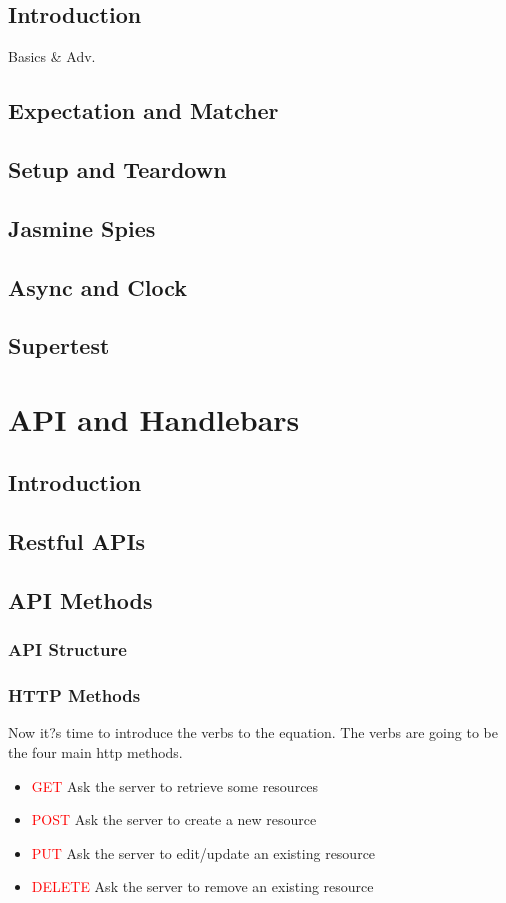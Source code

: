 \documentclass[a4paper]{article}
\begin{document}
\subsection{Introduction}
Basics \& Adv.
\subsection{Expectation and Matcher}
\subsection{Setup and Teardown}
\subsection{Jasmine Spies}
\subsection{Async and Clock}
\subsection{Supertest}

\section{API and Handlebars}
\subsection{Introduction}
\subsection{Restful APIs}
\subsection{API Methods}
\subsubsection{API Structure}
\subsubsection{HTTP Methods}
Now it?s time to introduce the verbs to the equation. The verbs are going to be the four main http methods.
\begin{itemize}
\item \textcolor{red}{GET} Ask the server to retrieve some resources
\item \textcolor{red}{POST} Ask the server to create a new resource
\item \textcolor{red}{PUT}  Ask the server to edit/update an existing resource
\item \textcolor{red}{DELETE} Ask the server to remove an existing resource
\end{itemize}
\end{document}
